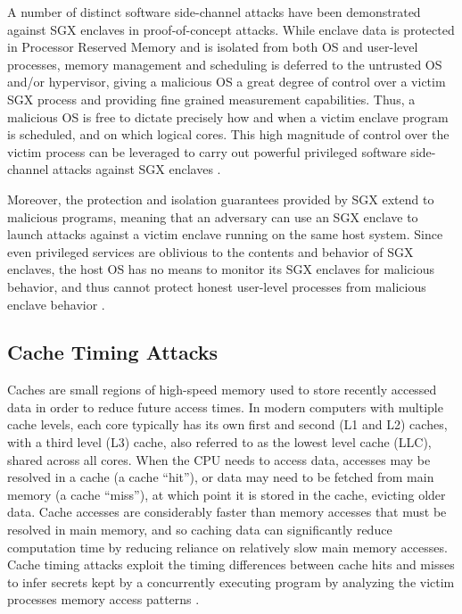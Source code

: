 A number of distinct software side-channel attacks have been demonstrated against SGX enclaves in proof-of-concept attacks. While enclave data is protected in Processor Reserved Memory and is isolated from both OS and user-level processes, memory management and scheduling is deferred to the untrusted OS and/or hypervisor, giving a malicious OS a great degree of control over a victim SGX process and providing fine grained measurement capabilities. Thus, a malicious OS is free to dictate precisely how and when a victim enclave program is scheduled, and on which logical cores. This high magnitude of control over the victim process can be leveraged to carry out powerful privileged software side-channel attacks against SGX enclaves \cite{costan_intel_2016}. 

Moreover, the protection and isolation guarantees provided by SGX extend to malicious programs, meaning that an adversary can use an SGX enclave to launch attacks against a victim enclave running on the same host system. Since even privileged services are oblivious to the contents and behavior of SGX enclaves, the host OS has no means to monitor its SGX enclaves for malicious behavior, and thus cannot protect honest user-level processes from malicious enclave behavior \cite{costan_intel_2016, schwarz_malware_2017}.

\subsection{Cache Timing Attacks}

Caches are small regions of high-speed memory used to store recently accessed data in order to reduce future access times. In modern computers with multiple cache levels, each core typically has its own first and second (L1 and L2) caches, with a third level (L3) cache, also referred to as the lowest level cache (LLC), shared across all cores. When the CPU needs to access data, accesses may be resolved in a cache (a cache ``hit''), or data may need to be fetched from main memory (a cache ``miss''), at which point it is stored in the cache, evicting older data. Cache accesses are considerably faster than memory accesses that must be resolved in main memory, and so caching data can significantly reduce computation time by reducing reliance on relatively slow main memory accesses. Cache timing attacks exploit the timing differences between cache hits and misses to infer secrets kept by a concurrently executing program by analyzing the victim processes memory access patterns \cite{costan_intel_2016, moghimi_cachezoom:_2017}.  

